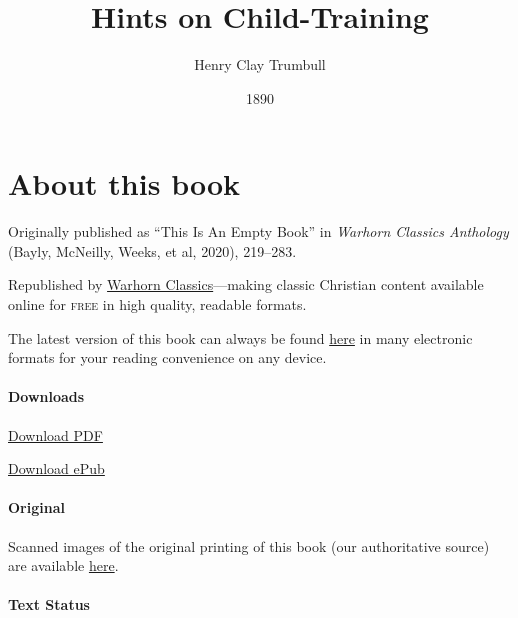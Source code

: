 \documentclass[
]{book}
\title{Hints on Child-Training}
\author{Henry Clay Trumbull}
\date{1890}
\begin{document}
\maketitle

\mainmatter
{}

{
\setcounter{tocdepth}{1}
\tableofcontents
}
\hypertarget{about-this-book}{%
\chapter*{About this book}\label{about-this-book}}

Originally published as ``This Is An Empty Book'' in \emph{Warhorn Classics Anthology} (Bayly, McNeilly, Weeks, et al, 2020), 219--283.

Republished by \href{https://classics.warhornmedia.com/}{Warhorn Classics}---making classic Christian content available online for \textsc{free} in high quality, readable formats.

The latest version of this book can always be found \href{https://warhornmedia.github.io/trumbull-child-training/}{here} in many electronic formats for your reading convenience on any device.

\hypertarget{downloads}{%
\subsubsection*{Downloads}\label{downloads}}

\href{https://warhornmedia.github.io/trumbull-child-training//Trumbull-Hints_on_Child_Training.pdf}{Download PDF}

\href{https://warhornmedia.github.io/trumbull-child-training//Trumbull-Hints_on_Child_Training.epub}{Download ePub}

\hypertarget{original}{%
\subsubsection*{Original}\label{original}}

Scanned images of the original printing of this book (our authoritative source) are available \href{https://archive.org/details/hintsonchildtrai00trum}{here}.

\hypertarget{text-status}{%
\subsubsection*{Text Status}\label{text-status}}
\end{document}
